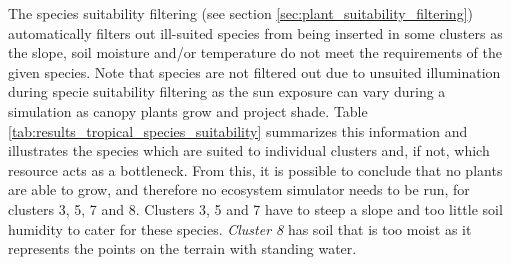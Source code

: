 The species suitability filtering (see section \ref{sec:plant_suitability_filtering}) automatically filters out ill-suited species from being inserted in some clusters as the slope, soil moisture and/or temperature do not meet the requirements of the given species. Note that species are not filtered out due to unsuited illumination during specie suitability filtering as the sun exposure can vary during a simulation as canopy plants grow and project shade. Table \ref{tab:results_tropical_species_suitability} summarizes this information and illustrates the species which are suited to individual clusters and, if not, which resource acts as a bottleneck. From this, it is possible to conclude that no plants are able to grow, and therefore no ecosystem simulator needs to be run, for clusters 3, 5, 7 and 8. Clusters 3, 5 and 7 have to steep a slope and too little soil humidity to cater for these species. \textit{Cluster 8} has soil that is too moist as it represents the points on the terrain with standing water.\\


